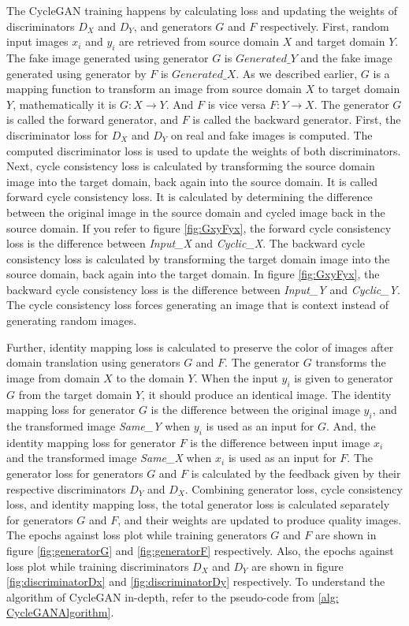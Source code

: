 The \ac{CycleGAN} training happens by calculating loss and updating the weights of discriminators $D_X$ and $D_Y$, and generators $G$ and $F$ respectively. First, random input images $x_i$ and $y_i$ are retrieved from source domain $X$ and target domain $Y$. The fake image generated using generator $G$ is $Generated\_Y$ and the fake image generated using generator by $F$ is $Generated\_X$. As we described earlier, $G$ is a mapping function to transform an image from source domain $X$ to target domain $Y$, mathematically it is $G: X \rightarrow Y$. And $F$ is vice versa $F: Y \rightarrow X$. The generator $G$ is called the forward generator, and $F$ is called the backward generator. First, the discriminator loss for $D_X$ and $D_Y$ on real and fake images is computed. The computed discriminator loss is used to update the weights of both discriminators. Next, cycle consistency loss is calculated by transforming the source domain image into the target domain, back again into the source domain. It is called forward cycle consistency loss. It is calculated by determining the difference between the original image in the source domain and cycled image back in the source domain. If you refer to figure \ref{fig:GxyFyx}, the forward cycle consistency loss is the difference between \textit{Input\_X} and \textit{Cyclic\_X}. The backward cycle consistency loss is calculated by transforming the target domain image into the source domain, back again into the target domain. In figure \ref{fig:GxyFyx}, the backward cycle consistency loss is the difference between \textit{Input\_Y} and \textit{Cyclic\_Y}. The cycle consistency loss forces generating an image that is context instead of generating random images.

Further, identity mapping loss is calculated to preserve the color of images after domain translation using generators $G$ and $F$. The generator $G$ transforms the image from domain $X$ to the domain $Y$. When the input $y_i$ is given to generator $G$ from the target domain $Y$, it should produce an identical image. The identity mapping loss for generator $G$ is the difference between the original image $y_i$, and the transformed image \textit{Same\_Y} when $y_i$ is used as an input for $G$. And, the identity mapping loss for generator $F$ is the difference between input image $x_i$ and the transformed image \textit{Same\_X} when $x_i$ is used as an input for $F$. The generator loss for generators $G$ and $F$ is calculated by the feedback given by their respective discriminators $D_Y$ and $D_X$. Combining generator loss, cycle consistency loss, and identity mapping loss, the total generator loss is calculated separately for generators $G$ and $F$, and their weights are updated to produce quality images. The epochs against loss plot while training generators $G$ and $F$ are shown in figure \ref{fig:generatorG} and \ref{fig:generatorF} respectively. Also, the epochs against loss plot while training discriminators $D_X$ and $D_Y$ are shown in figure \ref{fig:discriminatorDx} and \ref{fig:discriminatorDy} respectively. To understand the algorithm of \ac{CycleGAN} in-depth, refer to the pseudo-code from \ref{alg: CycleGANAlgorithm}.



